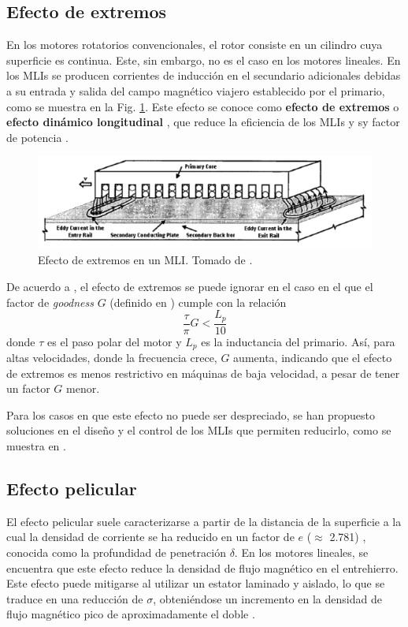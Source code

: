 \subsection{Efecto de extremos}
En los motores rotatorios convencionales, el rotor consiste en un cilindro cuya superficie es continua. Este, sin embargo, no es el caso en los motores lineales. En los MLIs se producen corrientes de inducción en el secundario adicionales debidas a su entrada y salida del campo magnético viajero establecido por el primario, como se muestra en la Fig. \ref{eelim}. Este efecto se conoce como \textbf{efecto de extremos} o \textbf{efecto dinámico longitudinal} \cite{boldea2013}, que reduce la eficiencia de los MLIs y sy factor de potencia \cite{bazghaleh2010,selcuk2008}. 

\begin{figure}[hbtp]
\centering
\includegraphics[scale=0.6]{../img/eelim.PNG}
\caption{Efecto de extremos en un MLI. Tomado de \cite{bazghaleh2010}.}
\label{eelim}
\end{figure}

De acuerdo a \cite{boldea2013}, el efecto de extremos se puede ignorar en el caso en el que el factor de \textit{goodness} $G$ (definido en \cite{laithwaite1965}) cumple con la relación
\begin{equation}
\frac{\tau}{\pi}G < \frac{L_p}{10}
\label{endeffectcond}
\end{equation}
donde $\tau$ es el paso polar del motor y $L_p$ es la inductancia del primario. Así, para altas velocidades, donde la frecuencia crece, $G$ aumenta, indicando que el efecto de extremos es menos restrictivo en máquinas de baja velocidad, a pesar de tener un factor $G$ menor.

Para los casos en que este efecto no puede ser despreciado, se han propuesto soluciones en el diseño y el control de los MLIs que permiten reducirlo, como se muestra en \cite{bazghaleh2010,kuznetsov2008,guo2012,zhang2012}.

\subsection{Efecto pelicular}
El efecto pelicular suele caracterizarse a partir de la distancia de la superficie a la cual la densidad de corriente se ha reducido en un factor de $e$ ($\approx$ 2.781) \cite{boldea2010}, conocida como la profundidad de penetración $\delta$. En los motores lineales, se encuentra que este efecto reduce la densidad de flujo magnético en el entrehierro. Este efecto puede mitigarse al utilizar un estator laminado y aislado, lo que se traduce en una reducción de $\sigma$, obteniéndose un incremento en la densidad de flujo magnético pico de aproximadamente el doble \cite{boldea2013}.

